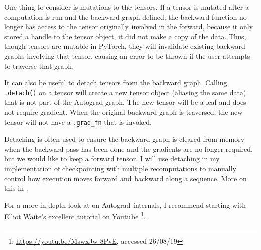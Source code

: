 One thing to consider is mutations to the tensors.
If a tensor is mutated after a computation is run and the backward graph defined, the backward function no longer has access to the tensor originally involved in the forward, because it only stored a handle to the tensor object, it did not make a copy of the data. 
Thus, though tensors are mutable in PyTorch, they will invalidate existing backward graphs involving that tensor, causing an error to be thrown if the user attempts to traverse that graph.

It can also be useful to detach tensors from the backward graph. Calling \texttt{.detach()} on a tensor will create a new tensor object (aliasing the same data) that is not part of the Autograd graph.
The new tensor will be a leaf and does not require gradient.
When the original backward graph is traversed, the new tensor will not have a \texttt{.grad\_fn} that is invoked.

Detaching is often used to ensure the backward graph is cleared from memory when the backward pass has been done and the gradients are no longer required, but we would like to keep a forward tensor.
I will use detaching in my implementation of checkpointing with multiple recomputations to manually control how execution moves forward and backward along a sequence.
More on this in \todo{[sec]}.

For a more in-depth look at on Autograd internals, I recommend starting with Elliot Waite's excellent tutorial on Youtube \footnote{\url{https://youtu.be/MswxJw-8PvE}, accessed 26/08/19}.

